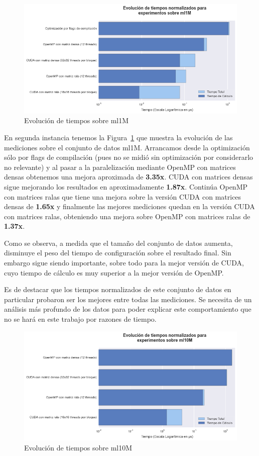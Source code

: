 \documentclass[11pt, a4paper]{article}
\begin{document}
  \begin{figure}[ht]
      \centering
      \includegraphics[width=\textwidth]{plots/ml1M.png}
      \caption{Evolución de tiempos sobre ml1M}\label{fig:ml1M}
  \end{figure}

  En segunda instancia tenemos la Figura~\ref{fig:ml1M} que muestra la
  evolución de las mediciones sobre el conjunto de datos ml1M. Arrancamos desde
  la optimización sólo por flags de compilación (pues no se midió sin
  optimización por considerarlo no relevante) y al pasar a la paralelización
  mediante OpenMP con matrices densas obtenemos una mejora aproximada de {\bf
  3.35x}. CUDA con matrices densas sigue mejorando los resultados en
  aproximadamente {\bf 1.87x}. Continúa OpenMP con matrices ralas que tiene una
  mejora sobre la versión CUDA con matrices densas de {\bf 1.65x} y finalmente
  las mejores mediciones quedan en la versión CUDA con matrices ralas,
  obteniendo una mejora sobre OpenMP con matrices ralas de {\bf 1.37x}.

  Como se observa, a medida que el tamaño del conjunto de datos aumenta,
  disminuye el peso del tiempo de configuración sobre el resultado final. Sin
  embargo sigue siendo importante, sobre todo para la mejor versión de CUDA,
  cuyo tiempo de cálculo es muy superior a la mejor versión de OpenMP.

  Es de destacar que los tiempos normalizados de este conjunto de datos en
  particular probaron ser los mejores entre todas las mediciones. Se necesita
  de un análisis más profundo de los datos para poder explicar este
  comportamiento que no se hará en este trabajo por razones de tiempo.
 
  \begin{figure}[ht]
      \centering
      \includegraphics[width=\textwidth]{plots/ml10M.png}
      \caption{Evolución de tiempos sobre ml10M}\label{fig:ml10M}
  \end{figure}
\end{document}
